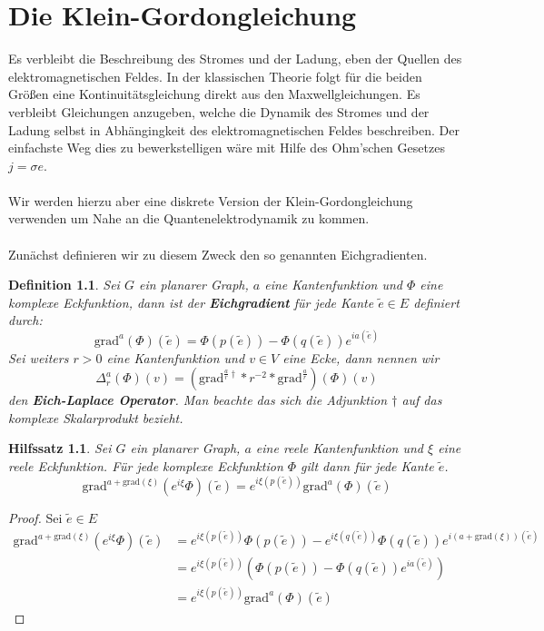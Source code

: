 \documentclass[11pt,a4paper,leqno]{report}
\newtheorem{lemma}[theorem]{Hilfssatz}
\newtheorem{definition}[theorem]{Definition}
\numberwithin{equation}{chapter}
\begin{document}
\chapter{Die Klein-Gordongleichung}
Es verbleibt die Beschreibung des Stromes und der Ladung, eben der Quellen des elektromagnetischen Feldes. In der klassischen Theorie folgt f\"ur die beiden Gr\"o\ss{}en eine Kontinuit\"atsgleichung direkt aus den Maxwellgleichungen. Es verbleibt Gleichungen anzugeben, welche die Dynamik des Stromes und der Ladung selbst in Abh\"angingkeit des elektromagnetischen Feldes beschreiben. Der einfachste Weg dies zu bewerkstelligen w\"are mit Hilfe des Ohm'schen Gesetzes $j=\sigma e$.\\
\\
Wir werden hierzu aber eine diskrete Version der Klein-Gordongleichung verwenden um Nahe an die Quantenelektrodynamik zu kommen.
\\
\\
Zun\"achst definieren wir zu diesem Zweck den so genannten Eichgradienten. 
\begin{definition}
	Sei $G$ ein planarer Graph, $a$ eine Kantenfunktion und $\Phi$ eine komplexe Eckfunktion, dann ist der \textbf{Eichgradient} f\"ur jede Kante $\tilde{e}\in E$ definiert durch:
	\begin{equation}
		\text{grad}^a(\Phi)(\tilde{e}) = \Phi(p(\tilde{e})) - \Phi(q(\tilde{e}))e^{ia(\tilde{e})}
	\end{equation}
	Sei weiters $r>0$ eine Kantenfunktion und $v\in V$ eine Ecke, dann nennen wir 
		\begin{equation}
		\Delta^a_r(\Phi)(v) = (\text{grad}^{{\frac{a}{r}}\dagger}*r^{-2}*\text{grad}^{\frac{a}{r}})(\Phi)(v)
	\end{equation} 
	den \textbf{Eich-Laplace Operator}. Man beachte das sich die Adjunktion $\dagger$ auf das komplexe Skalarprodukt bezieht.
\end{definition}
\begin{lemma}
	Sei $G$ ein planarer Graph, $a$ eine reele Kantenfunktion und $\xi$ eine reele Eckfunktion.  F\"ur jede komplexe Eckfunktion $\Phi$ gilt dann f\"ur jede Kante $\tilde{e}$.
	\begin{equation}
		\text{grad}^{a+\text{grad}(\xi)}(e^{i\xi}\Phi)(\tilde{e})=e^{i\xi(p(\tilde{e}))}\text{grad}^a(\Phi)(\tilde{e})
	\end{equation}
\end{lemma}
\begin{proof}
	Sei $\tilde{e}\in E$
	\begin{align*}
		\text{grad}^{a+\text{grad}(\xi)}(e^{i\xi}\Phi)(\tilde{e}) &= e^{i\xi(p(\tilde{e}))}\Phi(p(\tilde{e})) - e^{i\xi(q(\tilde{e}))}\Phi(q(\tilde{e}))e^{i(a+\text{grad}(\xi))(\tilde{e})}\\
		&= e^{i\xi(p(\tilde{e}))}(\Phi(p(\tilde{e})) - \Phi(q(\tilde{e}))e^{i a(\tilde{e})})\\
		&=e^{i\xi(p(\tilde{e}))}\text{grad}^a(\Phi)(\tilde{e})
	\end{align*}
\end{proof}
\end{document}
